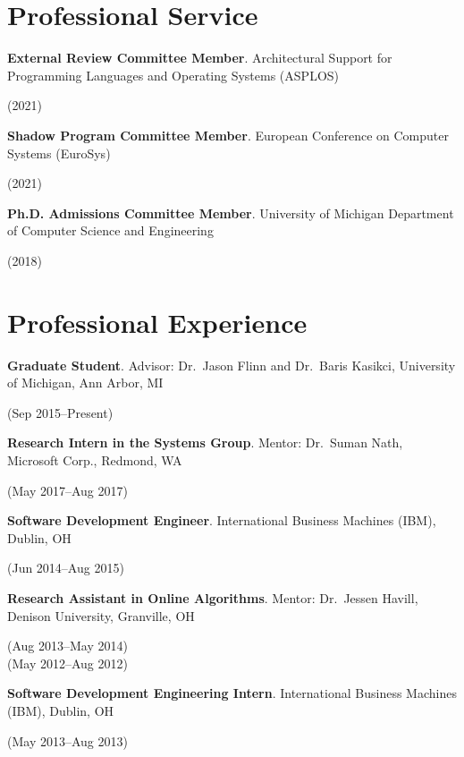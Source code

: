 \documentclass[letterpaper,10pt]{article}
\newcommand{\sidebyside}[2]{
  \begin{minipage}[t]{.75\textwidth}
    \raggedright{}
    #2
  \end{minipage}
  \hspace{.01\textwidth}
    \begin{minipage}[t]{.205\textwidth}
    \raggedleft
    #1
  \end{minipage}
}
\newcommand{\trio}[3]{\sidebyside{#3}{\textbf{#1}. #2}}
\begin{document}
\section{Professional Service}
\begin{smenumerate}
\item\trio{External Review Committee Member}{Architectural Support for
  Programming Languages and Operating Systems (ASPLOS)}{(2021)}

\item\trio{Shadow Program Committee Member}{European Conference on Computer
  Systems (EuroSys)}{(2021)}

\item\trio{Ph.D. Admissions Committee Member}{University of Michigan Department
  of Computer Science and Engineering}{(2018)}
\end{smenumerate}


\section{Professional Experience}
\begin{smenumerate}
\item\trio{Graduate Student}{Advisor: Dr.\ Jason Flinn and Dr.\ Baris Kasikci,
  University of Michigan, Ann Arbor, MI}{(Sep 2015--Present)}

\item\trio{Research Intern in the Systems Group}{Mentor: Dr.\ Suman Nath,
  Microsoft Corp., Redmond, WA}{(May 2017--Aug 2017)}

\item\trio{Software Development Engineer}{International Business Machines (IBM),
  Dublin, OH}{(Jun 2014--Aug 2015)}

\item\trio{Research Assistant in Online Algorithms}{Mentor: Dr.\ Jessen Havill,
  Denison University, Granville, OH}{(Aug 2013--May 2014)\\(May 2012--Aug 2012)}

\item\trio{Software Development Engineering Intern}{International Business
  Machines (IBM), Dublin, OH}{(May 2013--Aug 2013)}

\end{smenumerate}
\end{document}

